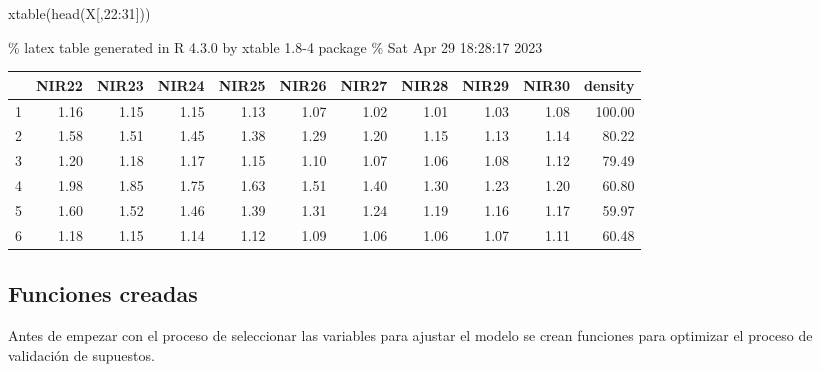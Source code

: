 \documentclass[
]{article}
\newenvironment{Shaded}{\begin{snugshade}}{\end{snugshade}}
\newcommand{\DecValTok}[1]{\textcolor[rgb]{0.00,0.00,0.81}{#1}}
\newcommand{\FunctionTok}[1]{\textcolor[rgb]{0.00,0.00,0.00}{#1}}
\newcommand{\NormalTok}[1]{#1}
\newcommand{\SpecialCharTok}[1]{\textcolor[rgb]{0.00,0.00,0.00}{#1}}
\begin{document}
\begin{Shaded}
\begin{Highlighting}[]
\FunctionTok{xtable}\NormalTok{(}\FunctionTok{head}\NormalTok{(X[,}\DecValTok{22}\SpecialCharTok{:}\DecValTok{31}\NormalTok{]))}
\end{Highlighting}
\end{Shaded}

\% latex table generated in R 4.3.0 by xtable 1.8-4 package \% Sat Apr
29 18:28:17 2023

\begin{table}[ht]
\centering
\begin{tabular}{rrrrrrrrrrr}
  \hline
 & NIR22 & NIR23 & NIR24 & NIR25 & NIR26 & NIR27 & NIR28 & NIR29 & NIR30 & density \\ 
  \hline
1 & 1.16 & 1.15 & 1.15 & 1.13 & 1.07 & 1.02 & 1.01 & 1.03 & 1.08 & 100.00 \\ 
  2 & 1.58 & 1.51 & 1.45 & 1.38 & 1.29 & 1.20 & 1.15 & 1.13 & 1.14 & 80.22 \\ 
  3 & 1.20 & 1.18 & 1.17 & 1.15 & 1.10 & 1.07 & 1.06 & 1.08 & 1.12 & 79.49 \\ 
  4 & 1.98 & 1.85 & 1.75 & 1.63 & 1.51 & 1.40 & 1.30 & 1.23 & 1.20 & 60.80 \\ 
  5 & 1.60 & 1.52 & 1.46 & 1.39 & 1.31 & 1.24 & 1.19 & 1.16 & 1.17 & 59.97 \\ 
  6 & 1.18 & 1.15 & 1.14 & 1.12 & 1.09 & 1.06 & 1.06 & 1.07 & 1.11 & 60.48 \\ 
   \hline
\end{tabular}
\end{table}

\hypertarget{funciones-creadas}{%
\subsection{Funciones creadas}\label{funciones-creadas}}

Antes de empezar con el proceso de seleccionar las variables para
ajustar el modelo se crean funciones para optimizar el proceso de
validación de supuestos.
\end{document}

